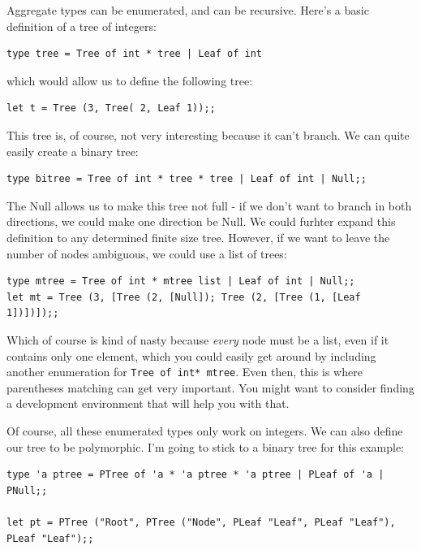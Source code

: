 \documentclass[10pt]{book}
\begin{document}
{Aggregate types can be enumerated, and can be recursive. Here's a basic definition of a tree of integers:

\beforeverb
\begin{verbatim}
type tree = Tree of int * tree | Leaf of int
\end{verbatim}
\afterverb

which would allow us to define the following tree:

\beforeverb
\begin{verbatim}
let t = Tree (3, Tree( 2, Leaf 1));;
\end{verbatim}
\afterverb

This tree is, of course, not very interesting because it can't branch. We can quite easily create a binary tree:

\beforeverb
\begin{verbatim}
type bitree = Tree of int * tree * tree | Leaf of int | Null;;
\end{verbatim}
\afterverb

The Null allows us to make this tree not full - if we don't want to branch in both directions, we could make one direction be Null. We could furhter expand this definition to any determined finite size tree. However, if we want to leave the number of nodes ambiguous, we could use a list of trees:

\beforeverb
\begin{verbatim}
type mtree = Tree of int * mtree list | Leaf of int | Null;;
let mt = Tree (3, [Tree (2, [Null]); Tree (2, [Tree (1, [Leaf 1])])]);;
\end{verbatim}
\afterverb

Which of course is kind of nasty because {\it every} node must be a list, even if it contains only one element, which you could easily get around by including another enumeration for {\tt Tree of int* mtree}. Even then, this is where parentheses matching can get very important. You might want to consider finding a development environment that will help you with that.

Of course, all these enumerated types only work on integers. We can also define our tree to be polymorphic. I'm going to stick to a binary tree for this example:

\beforeverb
\begin{verbatim}
type 'a ptree = PTree of 'a * 'a ptree * 'a ptree | PLeaf of 'a | PNull;;

let pt = PTree ("Root", PTree ("Node", PLeaf "Leaf", PLeaf "Leaf"), PLeaf "Leaf");;
\end{verbatim}
\afterverb

}
\end{document}
